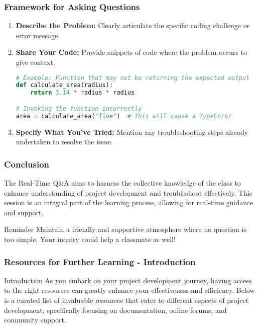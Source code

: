 \documentclass[aspectratio=169]{beamer}
\begin{document}
\begin{frame}[fragile]
    \frametitle{Framework for Asking Questions}
    \begin{enumerate}
        \item \textbf{Describe the Problem:}
            Clearly articulate the specific coding challenge or error message.
        
        \item \textbf{Share Your Code:}
            Provide snippets of code where the problem occurs to give context.
            \begin{lstlisting}[language=Python]
# Example: Function that may not be returning the expected output
def calculate_area(radius):
    return 3.14 * radius * radius

# Invoking the function incorrectly
area = calculate_area("five")  # This will cause a TypeError
            \end{lstlisting}
        
        \item \textbf{Specify What You've Tried:}
            Mention any troubleshooting steps already undertaken to resolve the issue.
    \end{enumerate}
\end{frame}

\begin{frame}
    \frametitle{Conclusion}
    The Real-Time Q\&A aims to harness the collective knowledge of the class to enhance understanding of project development and troubleshoot effectively. This session is an integral part of the learning process, allowing for real-time guidance and support.
    
    \begin{block}{Reminder}
        Maintain a friendly and supportive atmosphere where no question is too simple. Your inquiry could help a classmate as well!
    \end{block}
\end{frame}

\begin{frame}[fragile]
  \frametitle{Resources for Further Learning - Introduction}
  \begin{block}{Introduction}
    As you embark on your project development journey, having access to the right resources can greatly enhance your effectiveness and efficiency. Below is a curated list of invaluable resources that cater to different aspects of project development, specifically focusing on documentation, online forums, and community support.
  \end{block}
\end{frame}
\end{document}
